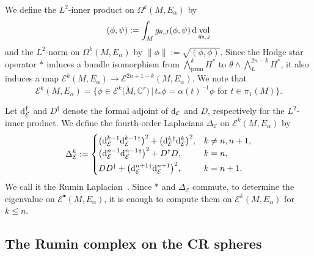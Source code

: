 \documentclass[10pt,a4paper]{amsart}
\numberwithin{equation}{section}
\DeclareMathOperator{\vol}{vol}
\DeclareMathOperator{\prim}{prim}
\newcommand{\adjoint}{\dagger}
\newcommand{\RN}{\cE}
\newcommand{\bC}{\mathbb{C}}
\newcommand{\cE}{\mathcal{E}}
\begin{document}
We define the $L^2$-inner product on $\Omega^{k} (M,E_{\alpha})$ by
\[
(\phi , \psi ) := \int_M g_{\theta , J} (\phi , \psi )\, {\rm d}\vol_{g_{\theta , J}}
\]
and the $L^2$-norm on $\Omega^k (M,E_{\alpha})$ by $\| \phi \| := \sqrt{(\phi , \phi )}$.
Since the Hodge star operator $*$ induces a bundle isomorphism
from $ \textstyle \bigwedge_{\prim}^{k} H^*$ %
to $\theta \wedge \textstyle \bigwedge_{L}^{2n-k} H^*$,
it also induces a map $\cE ^{k} (M,E_{\alpha} ) \to \cE ^{2n+1-k} (M,E_{\alpha}) $.
We note that
\[
 \cE^k ( M , E_{\alpha})
 =
 \big\{
 \phi \in \cE^k \big( \widetilde M , \bC^r \big)
 \, | \,
 t_* \phi = \alpha (t)^{-1} \phi \text{ for } t \in \pi_1 (M)
 \big\}
 .
\]

Let ${\rm d}_\RN ^{\adjoint }$ and $D^{\adjoint }$ denote the formal adjoint of ${\rm d}_\RN $ and $D$, respectively for the $L^2$-inner product.
We define the fourth-order Laplacians $\Delta_\RN $ on $\cE ^k (M,E_{\alpha} )$ by
\[
\Delta_\RN ^k
 :=
\begin{cases}
\big( {\rm d}_\RN ^{k-1} {\rm d}_\RN ^{k-1} {}^{\adjoint }\big)^2 + \big({\rm d}_\RN ^{k} {}^{\adjoint } {\rm d}_\RN ^{k} \big)^2 , & k \not = n , n+1 , \\
\vspace{1mm}
\big( {\rm d}_\RN ^{n-1} {\rm d}_\RN ^{n-1} {}^{\adjoint }\big)^2 + D^{\adjoint } D , & k=n, \\
D D^{\adjoint } + \big({\rm d}_\RN ^{n+1} {}^{\adjoint } {\rm d}_\RN ^{n+1} \big)^2 , & k =n+1.
\end{cases}
\]
We call it the Rumin Laplacian~\cite{Rumin-94}.
Since $*$ and $\Delta_\RN $ commute,
to determine the eigenvalue on $\cE ^\bullet (M,E_{\alpha} ) $,
it is enough to compute them on $\cE ^{k } (M,E_{\alpha})$ for $k \leq n$.


\subsection{The Rumin complex on the CR spheres}
\end{document}
